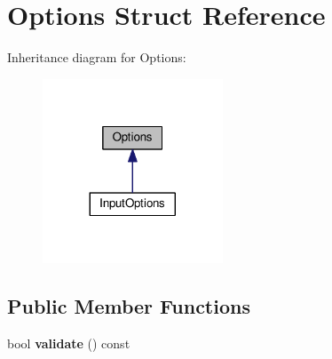 \hypertarget{structOptions}{}\section{Options Struct Reference}
\label{structOptions}


Inheritance diagram for Options\+:
\nopagebreak
\begin{figure}[H]
\begin{center}
\leavevmode
\includegraphics[width=152pt]{structOptions__inherit__graph}
\end{center}
\end{figure}
\subsection*{Public Member Functions}
\begin{DoxyCompactItemize}
\item 
bool {\bfseries validate} () const \hypertarget{structOptions_a0a376f3c34edd6b86db2ec91f2a94465}{}\label{structOptions_a0a376f3c34edd6b86db2ec91f2a94465}

\end{DoxyCompactItemize}
